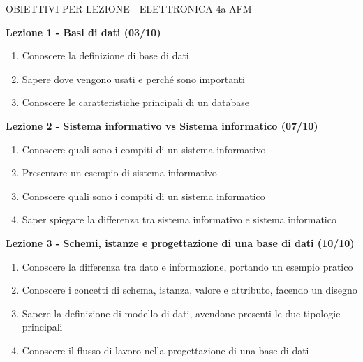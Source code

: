 \documentclass{article}
\begin{document}
\begin{center}
\begin{huge}
OBIETTIVI PER LEZIONE - ELETTRONICA 4a AFM
\end{huge}
\end{center}

	\begin{center}
	\end{center}

	\begin{center}
	\textbf{Lezione 1 - Basi di dati (03/10)}
	\begin{enumerate}
	\item Conoscere la definizione di base di dati
	\item Sapere dove vengono usati e perché sono importanti
	\item Conoscere le caratteristiche principali di un database
	\end{enumerate}
	\end{center}
	
	\begin{center}
	\textbf{Lezione 2 - Sistema informativo vs Sistema informatico (07/10)}
	\begin{enumerate}
	\item Conoscere quali sono i compiti di un sistema informativo
	\item Presentare un esempio di sistema informativo
	\item Conoscere quali sono i compiti di un sistema informatico
	\item Saper spiegare la differenza tra sistema informativo e sistema informatico
	\end{enumerate}
	\end{center}
	
	\begin{center}
	\textbf{Lezione 3 - Schemi, istanze e progettazione di una base di dati (10/10)}
	\begin{enumerate}
	\item Conoscere la differenza tra dato e informazione, portando un esempio pratico
	\item Conoscere i concetti di schema, istanza, valore e attributo, facendo un disegno
	\item Sapere la definizione di modello di dati, avendone presenti le due tipologie principali
	\item Conoscere il flusso di lavoro nella progettazione di una base di dati
	\end{enumerate}
	\end{center}
	
\end{document}
